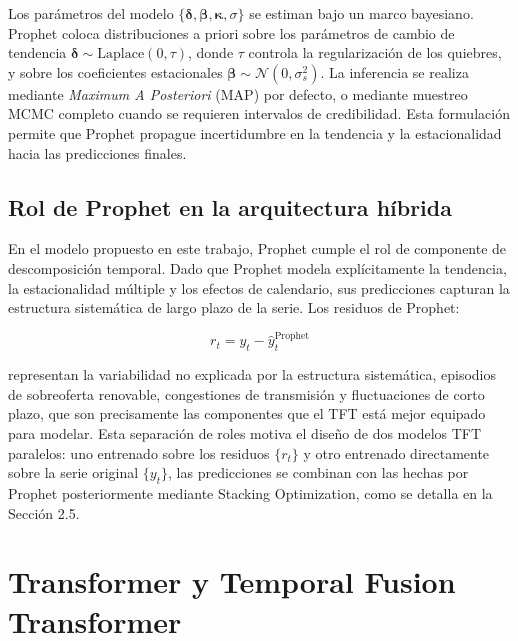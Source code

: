 Los parámetros del modelo $\{\boldsymbol{\delta}, \boldsymbol{\beta}, \boldsymbol{\kappa}, \sigma\}$ se estiman bajo un marco bayesiano. Prophet coloca distribuciones a priori sobre los parámetros de cambio de tendencia $\boldsymbol{\delta} \sim \text{Laplace}(0, \tau)$, donde $\tau$ controla la regularización de los quiebres, y sobre los coeficientes estacionales $\boldsymbol{\beta} \sim \mathcal{N}(0, \sigma_s^2)$. La inferencia se realiza mediante \textit{Maximum A Posteriori} (MAP) por defecto, o mediante muestreo MCMC completo cuando se requieren intervalos de credibilidad. Esta formulación permite que Prophet propague incertidumbre en la tendencia y la estacionalidad hacia las predicciones finales.

\subsection{Rol de Prophet en la arquitectura híbrida}

En el modelo propuesto en este trabajo, Prophet cumple el rol de componente de descomposición temporal. Dado que Prophet modela explícitamente la tendencia, la estacionalidad múltiple y los efectos de calendario, sus predicciones capturan la estructura sistemática de largo plazo de la serie. Los residuos de Prophet:

\begin{equation}
r_t = y_t - \hat{y}_t^{\text{Prophet}}
\end{equation}

representan la variabilidad no explicada por la estructura sistemática, episodios de sobreoferta renovable, congestiones de transmisión y fluctuaciones de corto plazo, que son precisamente las componentes que el TFT está mejor equipado para modelar. Esta separación de roles motiva el diseño de dos modelos TFT paralelos: uno entrenado sobre los residuos $\{r_t\}$ y otro entrenado directamente sobre la serie original $\{y_t\}$, las predicciones se combinan con las hechas por Prophet posteriormente mediante Stacking Optimization, como se detalla en la Sección 2.5.

\section{Transformer y Temporal Fusion Transformer}

